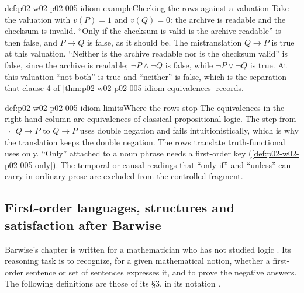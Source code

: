 \begin{hbexample}{def:p02-w02-p02-005-idiom-example}{Checking the rows against a valuation}
Take the valuation with \(v(P)=1\) and \(v(Q)=0\): the archive is readable
and the checksum is invalid.  ``Only if the checksum is valid is the archive
readable'' is then false, and \(P\to Q\) is false, as it should be.  The
mistranslation \(Q\to P\) is true at this valuation.  ``Neither is the
archive readable nor is the checksum valid'' is false, since the archive is
readable; \(\neg P\land\neg Q\) is false, while \(\neg P\lor\neg Q\) is true.
At this valuation ``not both'' is true and ``neither'' is false, which is
the separation that clause 4 of \cref{thm:p02-w02-p02-005-idiom-equivalences}
records.
\end{hbexample}

\begin{hbwarning}{def:p02-w02-p02-005-idiom-limits}{Where the rows stop}
The equivalences in the right-hand column are equivalences of classical
propositional logic.  The step from \(\neg\neg Q\to P\) to \(Q\to P\)
uses double negation and fails intuitionistically, which is why the
translation keeps the double negation.  The rows translate truth-functional
uses only.  ``Only'' attached to a noun phrase needs a first-order key
(\cref{def:p02-w02-p02-005-only}).  The temporal or causal readings that
``only if'' and ``unless'' can carry in ordinary prose are excluded from
the controlled fragment.
\end{hbwarning}

\subsection{First-order languages, structures and satisfaction after Barwise}
\label{sec:p02-w02-p02-005-barwise-setup}

Barwise's chapter is written for a mathematician who has not studied logic
\cite[ch.~A.1, \S1, p.~6]{Barwise1977FirstOrder}.  Its reasoning task is to
recognize, for a given mathematical notion, whether a first-order sentence
or set of sentences expresses it, and to prove the negative answers.  The
following definitions are those of its \S3, in its notation
\cite[ch.~A.1, \S3, pp.~17--22]{Barwise1977FirstOrder}.


